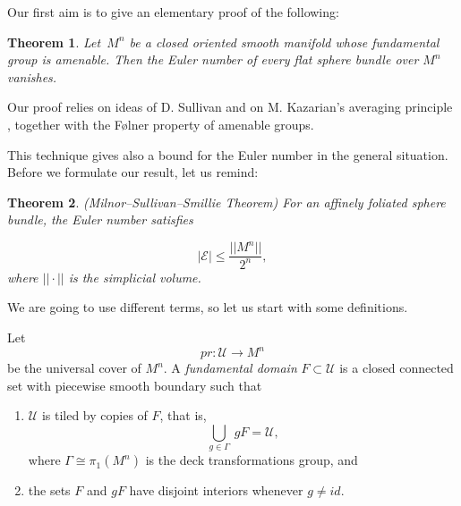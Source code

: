\documentclass[12pt]{amsart}
\theoremstyle{plain}
\newtheorem{theorem}{Theorem}
\theoremstyle{definition}
\theoremstyle{plain}
\theoremstyle{definition}
\renewcommand{\leq}{\leqslant}
\begin{document}
Our first aim is to give an elementary proof of the following:

\begin{theorem}\label{ThmMain}
Let~$M^n$ be a closed oriented smooth manifold  whose fundamental group is amenable. Then the Euler number of every flat sphere bundle  over $M^n$
 vanishes.
 
\end{theorem}


Our proof relies on ideas of D. Sullivan \cite{Sullivan} and  on M. Kazarian's averaging principle \cite{Kaz}, together with the F{\o}lner property of amenable groups.

\medskip

This technique gives also a bound for the Euler number in the general situation. Before we formulate our result, let us remind:




\begin{theorem}\label{ThmGromovSmillie} \cite{Gromov} (Milnor--Sullivan--Smillie Theorem)
  For an affinely foliated {sphere} bundle, the Euler number  satisfies
  
  $$|\mathcal{E}|\leq \frac{||M^n||}{2^n},$$
where $||\cdot||$ is the simplicial volume.

\end{theorem}




     
\bigskip

We are going to use different terms, so let us start with some definitions.

\medskip

Let $$pr:\mathcal{U}\rightarrow M^n$$ be the universal cover of $M^n$.
A \textit{ fundamental domain} $F \subset \mathcal{U}$ is a closed connected set  with piecewise smooth boundary such that 

\begin{enumerate}
  \item $\mathcal{U}$ is tiled by copies of $F$, that is,
 $$\bigcup_{g \in \Gamma}~ gF=\mathcal{U},$$ where  $\Gamma\cong \pi_1(M^n)$ is the  deck transformations group, and
  \item the sets  $F$ and $gF$ have disjoint interiors whenever $g \neq id$.
\end{enumerate}
\end{document}
